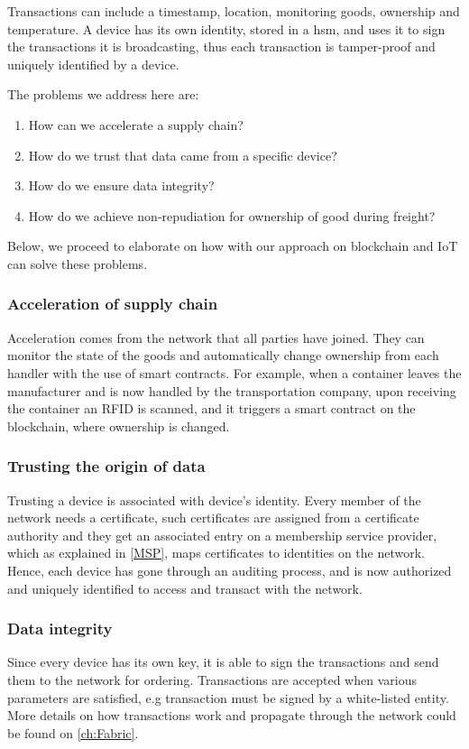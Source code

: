 Transactions can include a timestamp, location, monitoring goods, ownership and temperature. A device has its own identity, stored in a \acrshort{hsm}, and uses it to sign the transactions  it is broadcasting, thus each transaction is tamper-proof and uniquely identified by a device. 

The problems we address here are:
\begin{enumerate}
    \item How can we accelerate a supply chain?
    \item How do we trust that data came from a specific device?
    \item How do we ensure data integrity?
    \item How do we achieve non-repudiation for ownership of good during freight?
\end{enumerate} 
Below, we proceed to elaborate on how with our approach on blockchain and IoT can solve these problems.

\subsubsection{Acceleration of supply chain}
Acceleration comes from the network that all parties have joined. They can monitor the state of the goods and automatically change ownership from each handler with the use of smart contracts. For example, when a container leaves the manufacturer and is now handled by the transportation company, upon receiving the container an RFID is scanned, and it triggers a smart contract on the blockchain, where ownership is changed.

\subsubsection{Trusting the origin of data}
Trusting a device is associated with device's identity. Every member of the network needs a certificate, such certificates are assigned from a certificate authority and they get an associated entry on a membership service provider, which as explained in \ref{MSP}, maps certificates to identities on the network. Hence, each device has gone through an auditing process, and is now authorized and uniquely identified to access and transact with the network.

\subsubsection{Data integrity}
Since every device has its own key, it is able to sign the transactions and send them to the network for ordering. Transactions are accepted when various parameters are satisfied, e.g transaction must be signed by a white-listed entity. More details on how transactions work and propagate through the network could be found on \ref{ch:Fabric}.

